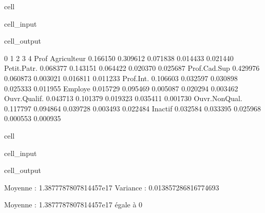 \documentclass[letterpaper,10pt,french]{sphinxmanual}
\begin{document}
\begin{sphinxuseclass}{cell}
\begin{sphinxuseclass}{cell_input}
\begin{sphinxVerbatim}[commandchars=\\\{\}]
\end{sphinxVerbatim}

\end{sphinxuseclass}
\begin{sphinxuseclass}{cell_output}
\begin{sphinxVerbatim}[commandchars=\\\{\}]
                       0         1         2         3         4
Prof                                                            
Agriculteur     0.166150  0.309612 \PYGZhy{}0.071838 \PYGZhy{}0.014433  0.021440
Petit.Patr.     0.068377  0.143151 \PYGZhy{}0.064422  0.020370 \PYGZhy{}0.025687
Prof.Cad.Sup   \PYGZhy{}0.429976  0.060873 \PYGZhy{}0.003021  0.016811  0.011233
Prof.Int.      \PYGZhy{}0.106603 \PYGZhy{}0.032597 \PYGZhy{}0.030898 \PYGZhy{}0.025333 \PYGZhy{}0.011955
Employe         0.015729 \PYGZhy{}0.095469 \PYGZhy{}0.005087 \PYGZhy{}0.020294  0.003462
Ouvr.Qualif.    0.043713 \PYGZhy{}0.101379 \PYGZhy{}0.019323  0.035411 \PYGZhy{}0.001730
Ouvr.Non\PYGZhy{}Qual.  0.117797 \PYGZhy{}0.094864 \PYGZhy{}0.039728  0.003493  0.022484
Inactif         0.032584  0.033395  0.025968  0.000553 \PYGZhy{}0.000935
\end{sphinxVerbatim}

\end{sphinxuseclass}
\end{sphinxuseclass}
\begin{sphinxuseclass}{cell}
\begin{sphinxuseclass}{cell_input}
\begin{sphinxVerbatim}[commandchars=\\\{\}]
\end{sphinxVerbatim}

\end{sphinxuseclass}
\begin{sphinxuseclass}{cell_output}
\begin{sphinxVerbatim}[commandchars=\\\{\}]
Moyenne :  1.3877787807814457e\PYGZhy{}17
Variance :  0.013857286816774693
\end{sphinxVerbatim}

\end{sphinxuseclass}
\end{sphinxuseclass}
\sphinxAtStartPar
Moyenne :  1.3877787807814457e\sphinxhyphen{}17  égale à 0
\end{document}
